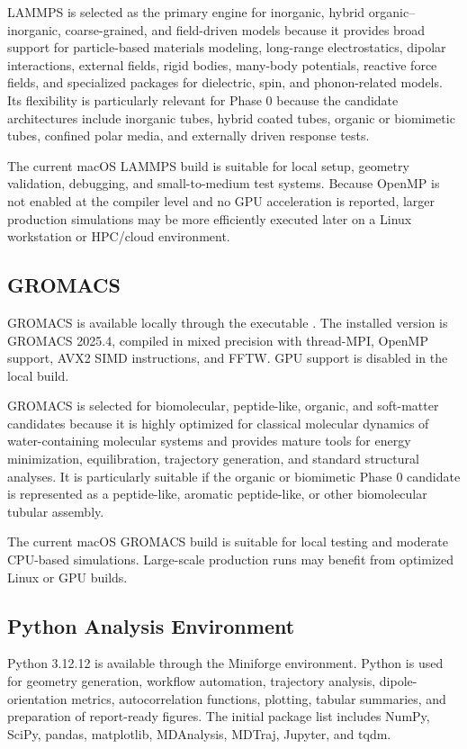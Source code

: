 \documentclass[11pt,letterpaper]{article}
\newcommand{\code}[1]{\texttt{\detokenize{#1}}}
\begin{document}
LAMMPS is selected as the primary engine for inorganic, hybrid organic--inorganic, coarse-grained, and field-driven models because it provides broad support for particle-based materials modeling, long-range electrostatics, dipolar interactions, external fields, rigid bodies, many-body potentials, reactive force fields, and specialized packages for dielectric, spin, and phonon-related models. Its flexibility is particularly relevant for Phase 0 because the candidate architectures include inorganic tubes, hybrid coated tubes, organic or biomimetic tubes, confined polar media, and externally driven response tests.

The current macOS LAMMPS build is suitable for local setup, geometry validation, debugging, and small-to-medium test systems. Because OpenMP is not enabled at the compiler level and no GPU acceleration is reported, larger production simulations may be more efficiently executed later on a Linux workstation or HPC/cloud environment.

\subsection{GROMACS}

GROMACS is available locally through the executable \code{gmx}. The installed version is GROMACS 2025.4, compiled in mixed precision with thread-MPI, OpenMP support, AVX2 SIMD instructions, and FFTW. GPU support is disabled in the local build.

GROMACS is selected for biomolecular, peptide-like, organic, and soft-matter candidates because it is highly optimized for classical molecular dynamics of water-containing molecular systems and provides mature tools for energy minimization, equilibration, trajectory generation, and standard structural analyses. It is particularly suitable if the organic or biomimetic Phase 0 candidate is represented as a peptide-like, aromatic peptide-like, or other biomolecular tubular assembly.

The current macOS GROMACS build is suitable for local testing and moderate CPU-based simulations. Large-scale production runs may benefit from optimized Linux or GPU builds.

\subsection{Python Analysis Environment}

Python 3.12.12 is available through the Miniforge environment. Python is used for geometry generation, workflow automation, trajectory analysis, dipole-orientation metrics, autocorrelation functions, plotting, tabular summaries, and preparation of report-ready figures. The initial package list includes NumPy, SciPy, pandas, matplotlib, MDAnalysis, MDTraj, Jupyter, and tqdm.
\end{document}
